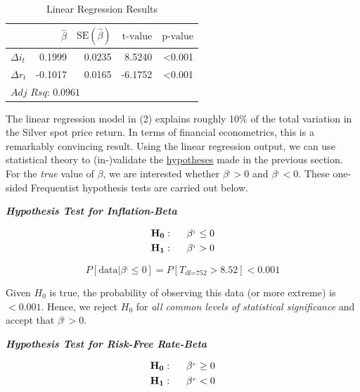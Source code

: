 \documentclass[
  12pt,
]{article}
\begin{document}
\begin{table}[!h]

\caption{\label{tab:lm-fit}Linear Regression Results}
\centering
\begin{tabular}[t]{lrrrr}
\toprule
  & $\hat{\beta}$ & $\textrm{SE}(\hat{\beta})$ & $\textrm{t-value}$ & $\textrm{p-value}$\\
\midrule
$\Delta i_t$ & 0.1999 & 0.0235 & 8.5240 & <0.001\\
$\Delta r_t$ & -0.1017 & 0.0165 & -6.1752 & <0.001\\
\bottomrule
\multicolumn{5}{l}{\rule{0pt}{1em}$\textit{Adj Rsq: 0.0961}$}\\
\end{tabular}
\end{table}

The linear regression model in (2) explains roughly 10\% of the total
variation in the Silver spot price return. In terms of financial
econometrics, this is a remarkably convincing result. Using the linear
regression output, we can use statistical theory to (in-)validate the
\protect\hyperlink{silver-spot-pricing-hypothesis}{hypotheses} made in
the previous section. For the \emph{true} value of \(\beta\), we are
interested whether \(\beta^{_i} > 0\) and \(\beta^{_r} < 0\). These
one-sided Frequentist hypothesis tests are carried out below.

\textbf{\emph{Hypothesis Test for Inflation-Beta}}

\begin{align}
\mathbf{H_0}: \hspace{5mm} \beta^{_i} &\leq 0 \notag\\
\mathbf{H_1}: \hspace{5mm} \beta^{_i} &> 0 \notag
\end{align}

\[P[ \textrm{data} | \beta^{_i} \leq 0] = P[T_{\textrm{df=}752} > 8.52] \mathbf{< 0.001}\]

Given \(H_0\) is true, the probability of observing this data (or more
extreme) is \(< 0.001\). Hence, we reject \(H_0\) for \emph{all common
levels of statistical significance} and accept that \(\beta^{_i} > 0\).

\textbf{\emph{Hypothesis Test for Risk-Free Rate-Beta}}

\begin{align}
\mathbf{H_0}: \hspace{5mm} \beta^{_r} &\geq 0 \notag\\
\mathbf{H_1}: \hspace{5mm} \beta^{_r} &< 0 \notag
\end{align}
\end{document}
